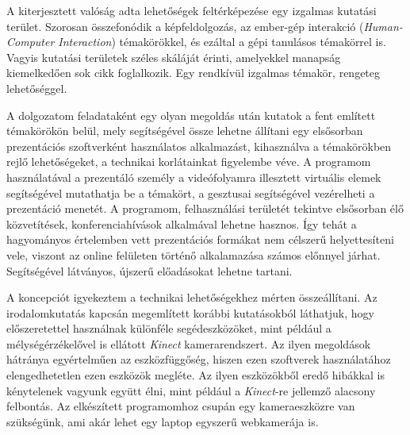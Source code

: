 




A kiterjesztett valóság adta lehetőségek feltérképezése egy izgalmas kutatási terület. Szorosan összefonódik a képfeldolgozás, az ember-gép interakció (\textit{Human-Computer Interaction}) témakörökkel, és ezáltal a gépi tanulásos témakörrel is. Vagyis kutatási területek széles skáláját érinti, amelyekkel manapság kiemelkedően sok cikk foglalkozik. Egy rendkívül izgalmas témakör, rengeteg lehetőséggel.

A dolgozatom feladataként egy olyan megoldás után kutatok a fent említett témakörökön belül, mely segítségével össze lehetne állítani egy elsősorban prezentációs szoftverként használatos alkalmazást, kihasználva a témakörökben rejlő lehetőségeket, a technikai korlátainkat figyelembe véve. A programom használatával a prezentáló személy a videófolyamra illesztett virtuális elemek segítségével mutathatja be a témakört, a gesztusai segítségével vezérelheti a prezentáció menetét. A programom, felhasználási területét tekintve elsősorban élő közvetítések, konferenciahívások alkalmával lehetne hasznos. Így tehát a hagyományos értelemben vett prezentációs formákat nem célszerű helyettesíteni vele, viszont az online felületen történő alkalamazása számos előnnyel járhat. Segítségével látványos, újszerű előadásokat lehetne tartani.

A koncepciót igyekeztem a technikai lehetőségekhez mérten összeállítani. Az irodalomkutatás kapcsán megemlített korábbi kutatásokból láthatjuk, hogy előszeretettel használnak különféle segédeszközöket, mint például a mélységérzékelővel is ellátott \textit{Kinect} kamerarendszert. Az ilyen megoldások hátránya egyértelműen az eszközfüggőség, hiszen ezen szoftverek használatához elengedhetetlen ezen eszközök megléte. Az ilyen eszközökből eredő hibákkal is kénytelenek vagyunk együtt élni, mint például a \textit{Kinect}-re jellemző alacsony felbontás. Az elkészített programomhoz csupán egy kameraeszközre van szükségünk, ami akár lehet egy laptop egyszerű webkamerája is.

